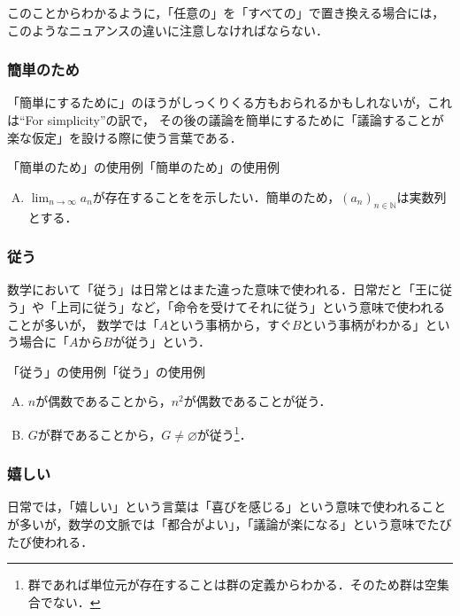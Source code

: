 \documentclass[a4paper,11pt]{ltjsarticle}
\begin{document}
このことからわかるように，「任意の」を「すべての」で置き換える場合には，このようなニュアンスの違いに注意しなければならない．

\subsubsection{簡単のため}

「簡単にするために」のほうがしっくりくる方もおられるかもしれないが，これは``For simplicity''の訳で，
その後の議論を簡単にするために「議論することが楽な仮定」を設ける際に使う言葉である．

\begin{example}{「簡単のため」の使用例}{「簡単のため」の使用例}
  \begin{enumerate}[(A)]
    \item $\lim_{n \to \infty} a_n$が存在することをを示したい．簡単のため，$(a_n)_{n \in \mathbb{N}}$は実数列とする．
  \end{enumerate}
\end{example}

\subsubsection{従う}

数学において「従う」は日常とはまた違った意味で使われる．日常だと「王に従う」や「上司に従う」など，「命令を受けてそれに従う」という意味で使われることが多いが，
数学では「$A$という事柄から，すぐ$B$という事柄がわかる」という場合に「$A$から$B$が従う」という．

\begin{example}{「従う」の使用例}{「従う」の使用例}
  \begin{enumerate}[(A)]
    \item $n$が偶数であることから，$n^2$が偶数であることが従う．\label{enu:偶数ならば偶数}
    \item $G$が群であることから，$G \ne \varnothing$が従う\footnote{群であれば単位元が存在することは群の定義からわかる．そのため群は空集合でない．}．\label{enu:群の例}
  \end{enumerate}
\end{example}

\subsubsection{嬉しい}

日常では，「嬉しい」という言葉は「喜びを感じる」という意味で使われることが多いが，数学の文脈では「都合がよい」，「議論が楽になる」という意味でたびたび使われる．
\end{document}
